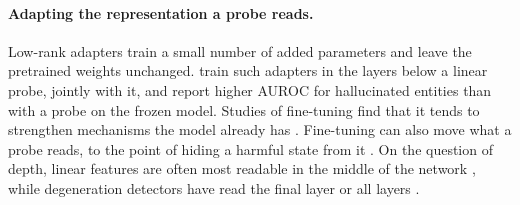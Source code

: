 \paragraph{Adapting the representation a probe reads.}
Low-rank adapters \citep{hu2022lora} train a small number of added parameters
and leave the pretrained weights unchanged. \citet{obeso2025realtime} train such
adapters in the layers below a linear probe, jointly with it, and report higher
AUROC for hallucinated entities than with a probe on the frozen model. Studies
of fine-tuning find that it tends to strengthen mechanisms the model already has
\citep{prakash2024finetuning}. Fine-tuning can also move what a probe reads, to
the point of hiding a harmful state from it \citep{bailey2026obfuscated}. On
the question of depth, linear features are often most readable in the middle of
the network \citep{skean2025layer}, while degeneration detectors have read the
final layer \citep{xie2025wordsalad,duan2026circular} or all layers
\citep{yu2025breaking}.
